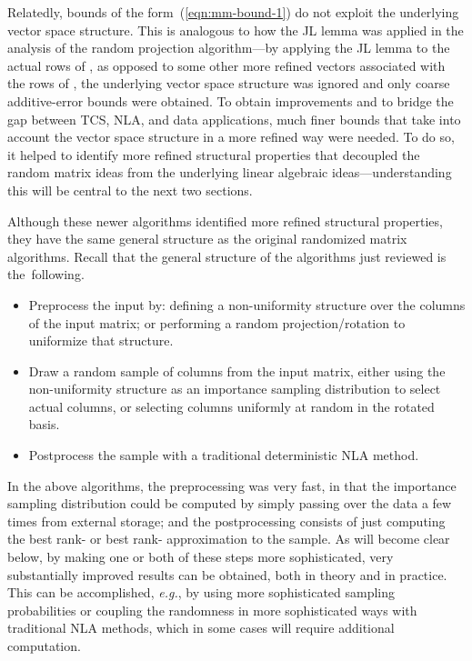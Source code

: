 \documentclass[twoside]{article}
\begin{document}
Relatedly, bounds of the form~(\ref{eqn:mm-bound-1}) do not exploit the 
underlying vector space structure.
This is analogous to how the JL lemma was applied in the analysis of the 
random projection algorithm---by applying the JL lemma to the actual rows 
of , as opposed to some other more refined vectors associated with the 
rows of , the underlying vector space structure was ignored and only 
coarse additive-error bounds were obtained.
To obtain improvements and to bridge the gap between TCS, NLA, and data
applications, much finer bounds that take into account the vector space 
structure in a more refined way were needed.
To do so, it helped to identify more refined structural properties that 
decoupled the random matrix ideas from the underlying linear algebraic 
ideas---understanding this will be central to the next two sections.

Although these newer algorithms identified more refined structural 
properties, they have the same general structure as the original 
randomized matrix algorithms.
Recall that the general structure of the algorithms just reviewed is 
the~following.
\begin{itemize}
\item
Preprocess the input by: defining a non-uniformity structure over the 
columns of the input matrix; or performing a random projection/rotation to 
uniformize that structure.
\item
Draw a random sample of columns from the input matrix, either using the
non-uniformity structure as an importance sampling distribution to select 
actual columns, or selecting columns uniformly at random in the rotated 
basis.
\item
Postprocess the sample with a traditional deterministic NLA method.
\end{itemize}
In the above algorithms, the preprocessing was very fast, in that the 
importance sampling distribution could be computed by simply passing over 
the data a few times from external storage; and the postprocessing consists 
of just computing the best rank- or best rank- approximation to the 
sample.
As will become clear below, by making one or both of these steps more 
sophisticated, very substantially improved results can be obtained, both in 
theory and in practice.
This can be accomplished, \emph{e.g.}, by using more sophisticated sampling 
probabilities or coupling the randomness in more sophisticated ways with 
traditional NLA methods, which in some cases will require additional 
computation.
\end{document}
